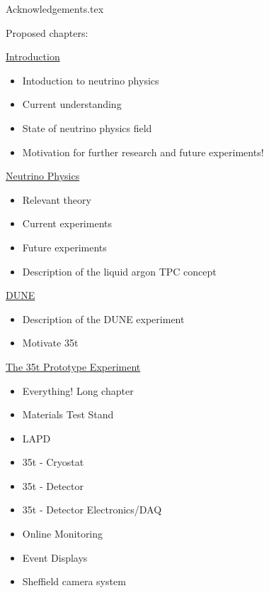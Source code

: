\documentclass[a4paper,12pt]{report}
\begin{document}
\renewcommand{\thepage}{\roman{page}}

\tableofcontents

\listoftables
{}
\listoffigures
{}
{Acknowledgements.tex}

\pagebreak

Proposed chapters:

\underline{Introduction}
\begin{itemize}
  \item{Intoduction to neutrino physics}
  \item{Current understanding}
  \item{State of neutrino physics field}
  \item{Motivation for further research and future experiments!}
\end{itemize}

\underline{Neutrino Physics}
\begin{itemize}
  \item{Relevant theory}
  \item{Current experiments}
  \item{Future experiments}
  \item{Description of the liquid argon TPC concept}
\end{itemize}

\underline{DUNE}
\begin{itemize}
  \item{Description of the DUNE experiment}
  \item{Motivate 35t}
\end{itemize}

\underline{The 35t Prototype Experiment}
\begin{itemize}
  \item{Everything!  Long chapter}
  \item{Materials Test Stand}
  \item{LAPD}
  \item{35t - Cryostat}
  \item{35t - Detector}
  \item{35t - Detector Electronics/DAQ}
  \item{Online Monitoring}
  \item{Event Displays}
  \item{Sheffield camera system}
\end{itemize}
\end{document}
